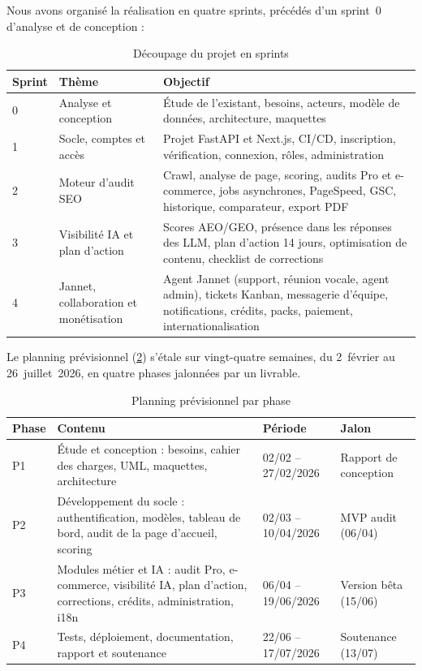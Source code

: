 Nous avons organisé la réalisation en quatre sprints, précédés d'un sprint~0 d'analyse et de conception :

\begin{table}[htbp]
\centering
\small
\caption{Découpage du projet en sprints}\label{tab-sprints}
\begin{tabularx}{\textwidth}{@{}llX@{}}
\toprule
\textbf{Sprint} & \textbf{Thème} & \textbf{Objectif}\\
\midrule
0 & Analyse et conception & Étude de l'existant, besoins, acteurs, modèle de données, architecture, maquettes\\
1 & Socle, comptes et accès & Projet FastAPI et Next.js, CI/CD, inscription, vérification, connexion, rôles, administration\\
2 & Moteur d'audit SEO & Crawl, analyse de page, scoring, audits Pro et e-commerce, jobs asynchrones, PageSpeed, GSC, historique, comparateur, export PDF\\
3 & Visibilité IA et plan d'action & Scores AEO/GEO, présence dans les réponses des LLM, plan d'action 14 jours, optimisation de contenu, checklist de corrections\\
4 & Jannet, collaboration et monétisation & Agent Jannet (support, réunion vocale, agent admin), tickets Kanban, messagerie d'équipe, notifications, crédits, packs, paiement, internationalisation\\
\bottomrule
\end{tabularx}
\end{table}

Le planning prévisionnel (\cref{tab-planning}) s'étale sur vingt-quatre semaines, du 2~février au 26~juillet~2026, en quatre phases jalonnées par un livrable. 

\begin{table}[htbp]
\centering
\small
\caption{Planning prévisionnel par phase}\label{tab-planning}
\begin{tabularx}{\textwidth}{@{}lXll@{}}
\toprule
\textbf{Phase} & \textbf{Contenu} & \textbf{Période} & \textbf{Jalon}\\
\midrule
P1 & Étude et conception : besoins, cahier des charges, UML, maquettes, architecture & 02/02 -- 27/02/2026 & Rapport de conception\\
P2 & Développement du socle : authentification, modèles, tableau de bord, audit de la page d'accueil, scoring & 02/03 -- 10/04/2026 & MVP audit (06/04)\\
P3 & Modules métier et IA : audit Pro, e-commerce, visibilité IA, plan d'action, corrections, crédits, administration, i18n & 06/04 -- 19/06/2026 & Version bêta (15/06)\\
P4 & Tests, déploiement, documentation, rapport et soutenance & 22/06 -- 17/07/2026 & Soutenance (13/07)\\
\bottomrule
\end{tabularx}
\end{table}

